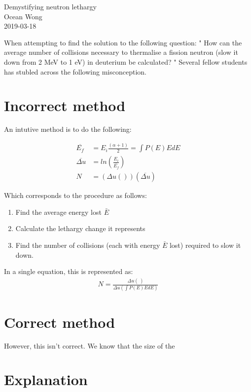 \documentclass[a4paper, 12pt]{article}
\begin{document}
\begin{center}
Demystifying neutron lethargy			\\
Ocean Wong								\\
2019-03-18
\end{center}

When attempting to find the solution to the following question:
"
How can the average number of collisions necessary to thermalise a fission neutron (slow
it down from 2 MeV to 1 eV) in deuterium be calculated?
"
Several fellow students has stubled across the following misconception.

\section{Incorrect method}
An intutive method is to do the following:

\begin{align}
	\overline{E_f} &= {E_i} \frac{(\alpha+1)}{2} =  \int P(E) E dE \\
	\overline{\Delta u} &= ln \left( \frac{E_i}{\overline{E_f}} \right)	\\
	N &= {\left(\Delta u () \right)} {\left( \overline{\Delta u} \right)}
\end{align}

Which corresponds to the procedure as follows:
\begin{enumerate}
	\item Find the average energy lost $\bar{E}$
	\item Calculate the lethargy change it represents
	\item Find the number of collisions (each with energy $\bar{E}$ lost) required to slow it down.
\end{enumerate}

In a single equation, this is represented as:
\begin{align}
	N=\frac{\Delta u ( \frac{}{} )}{\Delta u \left(\int P(E) E dE \right) }
\end{align}

\section{Correct method}
	However, this isn't correct. We know that the size of the

\section{Explanation}
\end{document}
